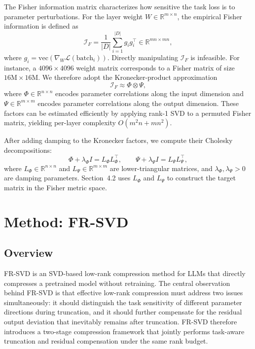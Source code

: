 \documentclass[a4paper,fleqn]{cas-dc}
\begin{document}
The Fisher information matrix characterizes how sensitive the task loss is to parameter perturbations. For the layer weight $W \in \mathbb{R}^{m \times n}$, the empirical Fisher information is defined as
\begin{equation}
\mathcal{I}_F = \frac{1}{|D|} \sum_{i=1}^{|D|} g_i g_i^\top \in \mathbb{R}^{mn \times mn},
\tag{P7}
\end{equation}
where $g_i = \mathrm{vec}(\nabla_W \mathcal{L}(\mathrm{batch}_i))$. Directly manipulating $\mathcal{I}_F$ is infeasible. For instance, a $4096 \times 4096$ weight matrix corresponds to a Fisher matrix of size $16\text{M} \times 16\text{M}$. We therefore adopt the Kronecker-product approximation
\begin{equation}
\mathcal{I}_F \approx \Phi \otimes \Psi,
\tag{P8}
\end{equation}
where $\Phi \in \mathbb{R}^{n \times n}$ encodes parameter correlations along the input dimension and $\Psi \in \mathbb{R}^{m \times m}$ encodes parameter correlations along the output dimension. These factors can be estimated efficiently by applying rank-1 SVD to a permuted Fisher matrix, yielding per-layer complexity $O(m^2 n + mn^2)$.

After adding damping to the Kronecker factors, we compute their Cholesky decompositions:
\begin{equation}
\Phi + \lambda_\Phi I = L_\Phi L_\Phi^\top, \qquad \Psi + \lambda_\Psi I = L_\Psi L_\Psi^\top,
\tag{P9}
\end{equation}
where $L_\Phi \in \mathbb{R}^{n \times n}$ and $L_\Psi \in \mathbb{R}^{m \times m}$ are lower-triangular matrices, and $\lambda_\Phi, \lambda_\Psi > 0$ are damping parameters. Section~4.2 uses $L_\Phi$ and $L_\Psi$ to construct the target matrix in the Fisher metric space.

\section{Method: FR-SVD}

\subsection{Overview}

FR-SVD is an SVD-based low-rank compression method for LLMs that directly compresses a pretrained model without retraining. The central observation behind FR-SVD is that effective low-rank compression must address two issues simultaneously: it should distinguish the task sensitivity of different parameter directions during truncation, and it should further compensate for the residual output deviation that inevitably remains after truncation. FR-SVD therefore introduces a two-stage compression framework that jointly performs task-aware truncation and residual compensation under the same rank budget.
\end{document}
